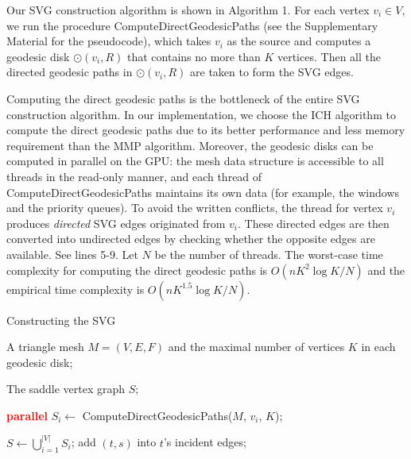 Our SVG construction algorithm is shown in Algorithm 1. For each
vertex $v_i\in V$, we run the procedure ComputeDirectGeodesicPaths
(see the Supplementary Material for the pseudocode), which takes
$v_i$ as the source and computes a geodesic disk $\odot(v_i,R)$ that
contains no more than $K$ vertices. Then all the directed geodesic
paths in $\odot(v_i,R)$ are taken to form the SVG edges.

Computing the direct geodesic paths is the bottleneck of the entire
SVG construction algorithm. In our implementation, we choose the ICH
algorithm to compute the direct geodesic paths due to its better
performance and less memory requirement than the MMP algorithm.
Moreover, the geodesic disks can be computed in parallel on the GPU:
the mesh data structure is accessible to all threads in the
read-only manner, and each thread of ComputeDirectGeodesicPaths
maintains its own data (for example, the windows and the priority
queues). To avoid the written conflicts, the thread for vertex $v_i$
produces \textit{directed} SVG edges originated from $v_i$. These
directed edges are then converted into undirected edges by checking
whether the opposite edges are available. See lines 5-9. Let $N$ be
the number of threads. The worst-case time complexity for computing
the direct geodesic paths is $O(nK^2\log K/N)$ and the empirical
time complexity is $O(nK^{1.5}\log K/N)$.

\begin{algorithm} [htbp]
\label{alg:construction} \caption{Constructing the SVG}
\begin{algorithmic}[1]
\Require A triangle mesh $M=(V,E,F)$ and the maximal number of
vertices $K$ in each geodesic disk;

\Ensure The saddle vertex graph $S$;


\State \textcolor{red}{\textbf{parallel}} $S_i \gets $
ComputeDirectGeodesicPaths($M$, $v_i$, $K$);

\EndIf

\State $S \gets \bigcup_{i=1}^{|V|} S_i$; 
        \State add $(t,s)$ into $t$'s incident edges;
    \EndIf
\EndFor

\end{algorithmic}
\end{algorithm}


